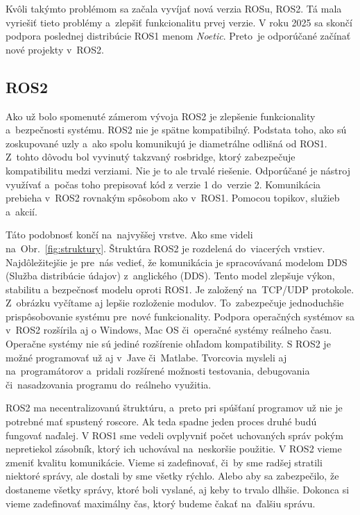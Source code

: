 Kvôli takýmto problémom sa začala vyvíjať nová verzia ROSu, ROS2. Tá mala vyriešiť tieto problémy a~zlepšiť funkcionalitu prvej verzie. V roku 2025 sa skončí
podpora poslednej distribúcie ROS1 menom \textit{Noetic}. Preto~je odporúčané začínať nové projekty v~ROS2.

\subsection{ROS2}

Ako už bolo spomenuté zámerom vývoja ROS2 je zlepšenie funkcionality a~bezpečnosti systému. ROS2 nie je spätne kompatibilný.
Podstata toho, ako sú zoskupované uzly a~ako spolu komunikujú je diametrálne odlišná od ROS1. Z~tohto dôvodu bol vyvinutý takzvaný rosbridge,
ktorý zabezpečuje kompatibilitu medzi verziami. Nie je to ale trvalé riešenie. Odporúčané je nástroj využívať a~počas toho prepisovať kód
z verzie 1 do~verzie 2. Komunikácia prebieha \newline v~ROS2 rovnakým spôsobom ako v~ROS1. Pomocou topikov, služieb a~akcií.

Táto podobnosť končí na~najvyššej vrstve. Ako sme videli na~Obr.~\ref{fig:struktury}. Štruktúra ROS2 je rozdelená do~viacerých vrstiev.
Najdôležitejšie je pre~nás vedieť, že komunikácia je spracovávaná modelom DDS (Služba distribúcie údajov) z~anglického (\acrlong{DDS}). Tento model zlepšuje výkon, stabilitu
a bezpečnosť modelu oproti ROS1. Je založený na~TCP/UDP protokole. Z~obrázku vyčítame aj lepšie rozloženie modulov. To~zabezpečuje jednoduchšie
prispôsobovanie systému pre~nové funkcionality. Podpora operačných systémov sa v~ROS2 rozšírila aj o Windows, Mac OS či~operačné systémy reálneho času.
Operačne systémy nie sú jediné rozšírenie ohľadom kompatibility. S ROS2 je možné programovať už aj v~Jave či~Matlabe.
Tvorcovia mysleli aj na~programátorov a~pridali rozšírené možnosti testovania, debugovania či~nasadzovania programu do~reálneho využitia.

ROS2 ma necentralizovanú štruktúru, a~preto pri spúšťaní programov už nie je potrebné mať spustený roscore. Ak teda spadne
jeden proces druhé budú fungovať naďalej. V ROS1 sme vedeli ovplyvniť počet uchovaných správ pokým nepretiekol zásobník, ktorý ich uchovával na~neskoršie použitie.
V ROS2 vieme zmeniť kvalitu komunikácie. Vieme si zadefinovať, či~by sme radšej stratili niektoré správy, ale dostali by sme všetky rýchlo. Alebo aby sa zabezpečilo,
že dostaneme všetky správy, ktoré boli vyslané, aj keby to trvalo dlhšie. Dokonca si vieme zadefinovať maximálny čas, ktorý budeme čakať na~ďalšiu správu.

